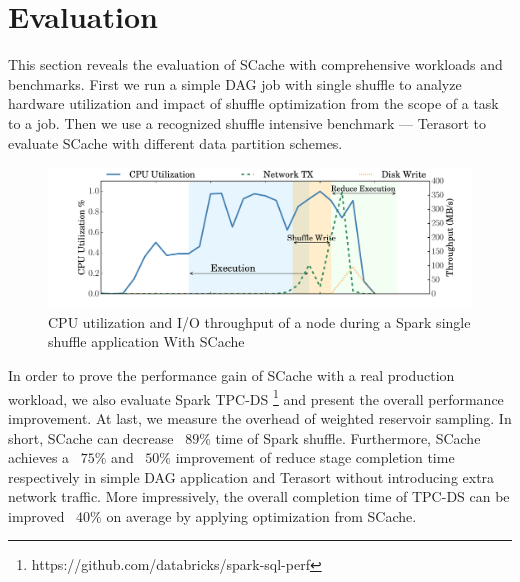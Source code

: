 \section{Evaluation}\label{evaluation}
This section reveals the evaluation of SCache with comprehensive workloads and benchmarks. First we run a simple DAG job with single shuffle to analyze hardware utilization and impact of shuffle optimization from the scope of a task to a job. 
Then we use a recognized shuffle intensive benchmark --- Terasort \cite{spark-tera} to evaluate SCache with different data partition schemes.

\begin{figure}
	\includegraphics[width=\linewidth]{fig/scache_util}
	\caption{CPU utilization and I/O throughput of a node during a Spark single shuffle application With SCache}
	\label{fig:scache_util}
\end{figure}

In order to prove the performance gain of SCache with a real production workload, we also evaluate Spark TPC-DS \footnote{https://github.com/databricks/spark-sql-perf} and present the overall performance improvement.
At last, we measure the overhead of weighted reservoir sampling. 
In short, SCache can decrease ~$89\%$ time of Spark shuffle. Furthermore, SCache achieves a ~$75\%$ and ~$50\%$ improvement of reduce stage completion time respectively in simple DAG application and Terasort without introducing extra network traffic. More impressively, the overall completion time of TPC-DS can be improved ~$40\%$ on average by applying optimization from SCache.

